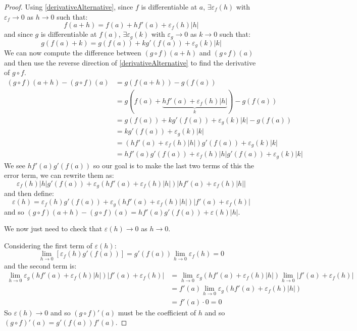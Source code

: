 \documentclass[../main.tex]{subfiles}
\begin{document}
\begin{proof}
  Using \cref{derivativeAlternative}, since $f$ is differentiable at $a$, $\exists \varepsilon_f(h)$ with $\varepsilon_f \to 0$ as $h \to 0$ such that:
  \[
    f(a + h) = f(a) + hf'(a) + \varepsilon_f(h)|h|
  \]
  and since $g$ is differentiable at $f(a)$, $\exists \varepsilon_g(k)$ with $\varepsilon_g \to 0$ as $k \to 0$ such that:
  \[
    g(f(a) + k) = g(f(a)) + kg'(f(a)) + \varepsilon_g(k)|k|
  \]
  We can now compute the difference between $(g \circ f)(a + h)$ and $(g \circ f)(a)$ and then use the reverse direction of \cref{derivativeAlternative} to find the derivative of $g \circ f$.
  \begin{align*}
    (g \circ f)(a + h) - (g \circ f)(a) &= g(f(a + h)) - g(f(a)) \\
                                        &= g(f(a) + \underbrace{hf'(a) + \varepsilon_f(h)|h|}_{k}) - g(f(a)) \\
                                        &= g(f(a)) + kg'(f(a)) + \varepsilon_g(k)|k| - g(f(a)) \\
                                        &= kg'(f(a)) + \varepsilon_g(k)|k| \\
                                        &= (hf'(a) + \varepsilon_f(h)|h|)g'(f(a)) + \varepsilon_g(k)|k| \\
                                        &= hf'(a)g'(f(a)) + \varepsilon_f(h)|h|g'(f(a)) + \varepsilon_g(k)|k|
  \end{align*}
  We see $hf'(a)g'(f(a))$ so our goal is to make the last two terms of this the error term, we can rewrite them as:
  \[
    \varepsilon_f(h)|h|g'(f(a)) + \varepsilon_g(hf'(a) + \varepsilon_f(h)|h|)|hf'(a) + \varepsilon_f(h)|h||
  \]
  and then define:
  \[
    \varepsilon(h) = \varepsilon_f(h)g'(f(a)) + \varepsilon_g(hf'(a) + \varepsilon_f(h)|h|)|f'(a) + \varepsilon_f(h)|
  \]
  and so $(g \circ f)(a + h) - (g \circ f)(a) = hf'(a)g'(f(a)) + \varepsilon(h)|h|$.

  We now just need to check that $\varepsilon(h) \to 0$ as $h \to 0$.

  Considering the first term of $\varepsilon(h)$:
  \[
    \lim_{h \to 0} [\varepsilon_f(h)g'(f(a))] = g'(f(a)) \lim_{h \to 0} \varepsilon_f(h) = 0
  \]
  and the second term is:
  \begin{align*}
    \lim_{h \to 0} \varepsilon_g(hf'(a) + \varepsilon_f(h)|h|)|f'(a) + \varepsilon_f(h)| &= \lim_{h \to 0} \varepsilon_g(hf'(a) + \varepsilon_f(h)|h|) \lim_{h \to 0} |f'(a) + \varepsilon_f(h)| \\
                                                                                         &= f'(a) \lim_{h \to 0} \varepsilon_g(hf'(a) + \varepsilon_f(h)|h|) \\
                                                                                         &= f'(a) \cdot 0 = 0
  \end{align*}
  So $\varepsilon(h) \to 0$ and so $(g \circ f)'(a)$ must be the coefficient of $h$ and so $(g \circ f)'(a) = g'(f(a))f'(a)$.
\end{proof}
\end{document}
